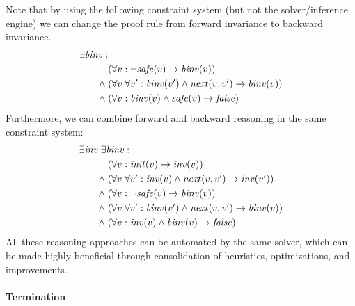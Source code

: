 \documentclass{new_tlp}
\newcommand{\limp}{\rightarrow}
\newcommand{\init}{\mathit{init}}
\newcommand{\next}{\mathit{next}}
\newcommand{\safe}{\mathit{safe}}
\newcommand{\inv}{\mathit{inv}}
\newcommand{\binv}{\mathit{binv}}
\newcommand{\lfalse}{\mathit{false}}
\begin{document}
Note that by using the following constraint system (but not the
solver/inference engine) we can change the proof rule from forward
invariance to backward invariance.
\begin{equation*}
  \begin{array}[t]{@{}l@{}}
    \exists \binv: \\[\jot]
    \qquad
    \begin{array}[t]{@{}l@{\;}l@{}}
      & (\forall v: \neg\safe(v) \limp \binv(v)) \\[\jot]
      \land & 
      (\forall v\; \forall v': \binv(v') \land \next(v, v') \limp \binv(v)) \\[\jot]
      \land & 
      (\forall v: \binv(v) \land \safe(v) \limp \lfalse)
    \end{array}
  \end{array}
\end{equation*}
Furthermore, we can combine forward and backward reasoning in the same
constraint system:
\begin{equation*}
  \begin{array}[t]{@{}l@{}}
    \exists \inv\;\exists \binv: \\[\jot]
    \qquad
    \begin{array}[t]{@{}l@{\;}l@{}}
      & (\forall v: \init(v) \limp \inv(v)) \\[\jot]
      \land & 
      (\forall v\; \forall v': \inv(v) \land \next(v, v') \limp \inv(v')) \\[\jot]
      \land & (\forall v: \neg\safe(v) \limp \binv(v)) \\[\jot]
      \land & 
      (\forall v\; \forall v': \binv(v') \land \next(v, v') \limp \binv(v)) \\[\jot]
      \land & 
      (\forall v:  \inv(v) \land \binv(v)  \limp \lfalse)
    \end{array}
  \end{array}
\end{equation*}
All these reasoning approaches can be automated by the same solver,
which can be made highly beneficial through consolidation of
heuristics, optimizations, and improvements.

\paragraph{Termination}
\end{document}
